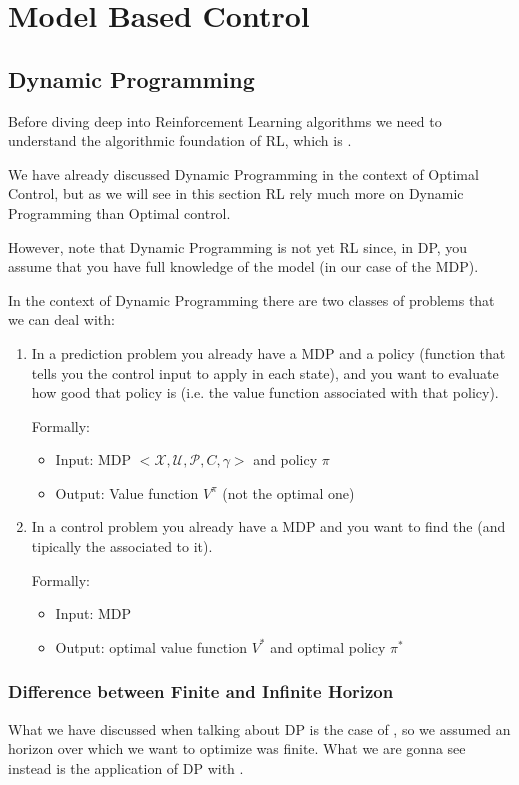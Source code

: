 \section{Model Based Control}
\subsection{Dynamic Programming}
Before diving deep into Reinforcement Learning algorithms we need to understand the algorithmic foundation of RL, which is .

We have already discussed Dynamic Programming in the context of Optimal Control, but as we will see in this section RL rely much more on Dynamic Programming than Optimal control.

However, note that Dynamic Programming is not yet RL since, in DP, you assume that you have full knowledge of the model (in our case of the MDP).

In the context of Dynamic Programming there are two classes of problems that we can deal with:
\begin{enumerate}
\item {}

In a prediction problem you already have a MDP and a policy (function that tells you the control input to apply in each state), and you want to evaluate how good that policy is (i.e. the value function associated with that policy).

Formally:
\begin{itemize}
\item Input: MDP $<\mathcal{X},\mathcal{U}, \mathcal{P},C, \gamma>$ and policy $\pi$
\item Output: Value function $V^{\pi}$ (not the optimal one)
\end{itemize}
\item {}

In a control problem you already have a MDP and you want to find the  (and tipically the  associated to it).

Formally:
\begin{itemize}
\item Input: MDP
\item Output: optimal value function $V^*$ and optimal policy $\pi^*$
\end{itemize}
\end{enumerate}

\subsubsection{Difference between Finite and Infinite Horizon}
What we have discussed when talking about DP is the case of , so we assumed an horizon over which we want to optimize was finite. What we are gonna see  instead is the application of DP with .

